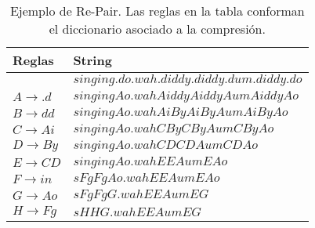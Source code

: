  \begin{table}%
\caption{Ejemplo de Re-Pair. Las reglas en la tabla conforman el diccionario asociado a la compresión.}
\label{table:repair}
\centering
\small

\begin{tabular}{|l|l|}
	\toprule
	Reglas & String \\
	\midrule
	 & $singing.do.wah.diddy.diddy.dum.diddy.do$ \\
	$A \rightarrow .d$ & $singingAo.wahAiddyAiddyAumAiddyAo$ \\
	$B \rightarrow dd$ & $singingAo.wahAiByAiByAumAiByAo$ \\
	$C \rightarrow Ai$ & $singingAo.wahCByCByAumCByAo$ \\
	$D \rightarrow By$ & $singingAo.wahCDCDAumCDAo$ \\
	$E \rightarrow CD$ & $singingAo.wahEEAumEAo$ \\
	$F \rightarrow in$ & $sFgFgAo.wahEEAumEAo$ \\
	$G \rightarrow Ao$ & $sFgFgG.wahEEAumEG$ \\
	$H \rightarrow Fg$ & $sHHG.wahEEAumEG$ \\
	\bottomrule
\end{tabular}
\end{table} 

